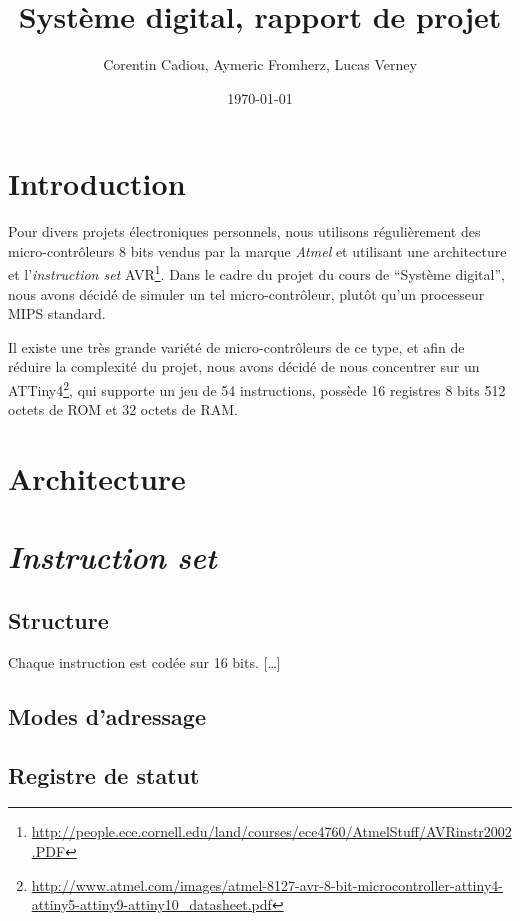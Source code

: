 \documentclass[11pt]{article}
\author{Corentin Cadiou, Aymeric Fromherz, Lucas Verney}
\date{\today}
\title{Système digital, rapport de projet}
\begin{document}
\maketitle
\section*{Introduction}
Pour divers projets électroniques personnels, nous utilisons régulièrement des micro-contrôleurs 8 bits vendus par la marque \emph{Atmel} et utilisant une architecture et l'\emph{instruction set} AVR\footnote{\url{http://people.ece.cornell.edu/land/courses/ece4760/AtmelStuff/AVRinstr2002.PDF}}. Dans le cadre du projet du cours de ``Système digital'', nous avons décidé de simuler un tel micro-contrôleur, plutôt qu'un processeur MIPS standard.

Il existe une très grande variété de micro-contrôleurs de ce type, et afin de réduire la complexité du projet, nous avons décidé de nous concentrer sur un ATTiny4\footnote{\url{http://www.atmel.com/images/atmel-8127-avr-8-bit-microcontroller-attiny4-attiny5-attiny9-attiny10_datasheet.pdf}}, qui supporte un jeu de 54 instructions, possède 16 registres 8 bits 512 octets de ROM et 32 octets de RAM.

\section{Architecture}

\section{\emph{Instruction set}}
\subsection{Structure}
Chaque instruction est codée sur 16 bits. […]

\subsection{Modes d'adressage}

\subsection{Registre de statut}
\end{document}
